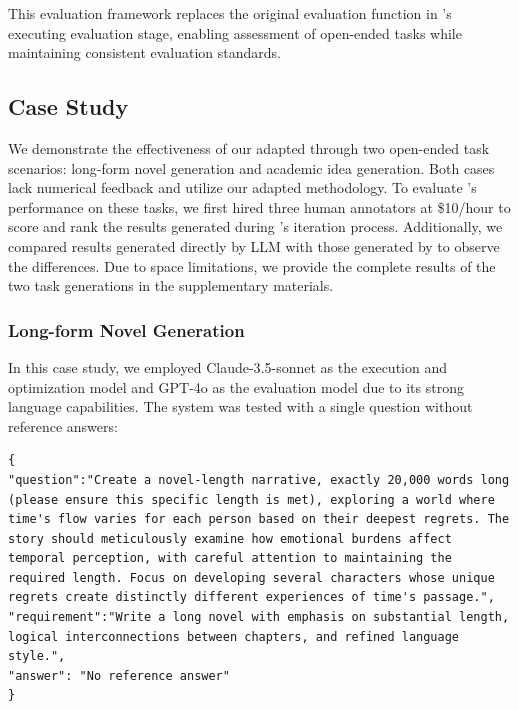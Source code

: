 This evaluation framework replaces the original evaluation function in \model's executing evaluation stage, enabling assessment of open-ended tasks while maintaining consistent evaluation standards.

\subsection{Case Study}
We demonstrate the effectiveness of our adapted \model through two open-ended task scenarios: long-form novel generation and academic idea generation. Both cases lack numerical feedback and utilize our adapted methodology. To evaluate \model's performance on these tasks, we first hired three human annotators at \$10/hour to score and rank the results generated during \model's iteration process. Additionally, we compared results generated directly by LLM with those generated by \model to observe the differences.
Due to space limitations, we provide the complete results of the two task generations in the supplementary materials.

\subsubsection{Long-form Novel Generation}
In this case study, we employed Claude-3.5-sonnet as the execution and optimization model and GPT-4o as the evaluation model due to its strong language capabilities. The system was tested with a single question without reference answers:

\label{appendix:Novel data}

\begin{tcolorbox}[title={\textbf{\small Novel data}}, boxrule=2pt, arc=0mm, breakable]\begin{verbatim}
{
"question":"Create a novel-length narrative, exactly 20,000 words long (please ensure this specific length is met), exploring a world where time's flow varies for each person based on their deepest regrets. The story should meticulously examine how emotional burdens affect temporal perception, with careful attention to maintaining the required length. Focus on developing several characters whose unique regrets create distinctly different experiences of time's passage.",
"requirement":"Write a long novel with emphasis on substantial length, logical interconnections between chapters, and refined language style.", 
"answer": "No reference answer"
}
\end{verbatim}
\end{tcolorbox}


